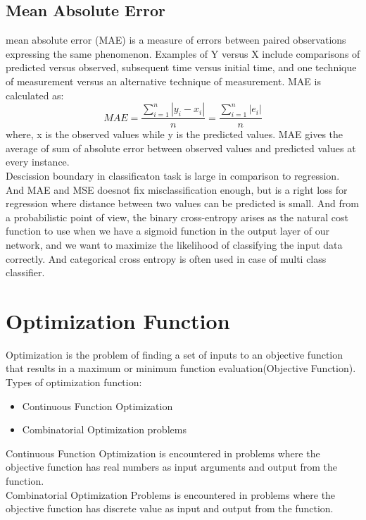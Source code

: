         \subsection{Mean Absolute Error}
            mean absolute error (MAE) is a measure of errors between paired observations expressing the same phenomenon. Examples of Y versus X  include comparisons of predicted versus observed, subsequent time  versus initial time, and one technique of measurement versus an  alternative technique of measurement. MAE is calculated as:\\
        \begin{equation}
            {MAE = \frac{\sum^n_{i=1}|y_i - x_i|}{n}} = \frac{\sum^n_{i=1}|e_i|}{n}
        \end{equation}
        where, x is the observed values while y is the predicted values. MAE gives the average of sum of absolute error between observed values and predicted values at every instance.\\
        Descission boundary in classificaton task is large in comparison to regression. And MAE and MSE doesnot fix misclassification enough, but is a right loss for regression where distance between two values can be predicted is small. And from a probabilistic point of view, the binary cross-entropy arises as the natural cost function to use when we have a sigmoid function in the output layer of our network, and we want to maximize the likelihood of classifying the input data correctly. And categorical cross entropy is often used in case of multi class classifier.\\
        
    \section{Optimization Function}
        Optimization is the problem of finding a set of inputs to an objective function that results in a maximum or minimum function evaluation(Objective Function).\\
        Types of optimization function:
        \begin{itemize}
            \item Continuous Function Optimization
            \item Combinatorial Optimization problems
        \end{itemize}
        Continuous Function Optimization is encountered in problems where the objective function has real numbers as input arguments and output from the function.\\
        Combinatorial Optimization Problems is encountered in problems where the objective function has discrete value as input and output from the function.
